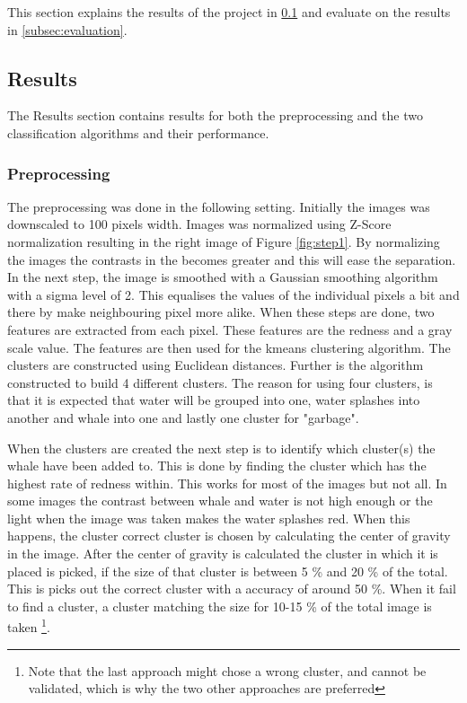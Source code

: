 This section explains the results of the project in \ref{subsec:results} and evaluate on the results in \ref{subsec:evaluation}.

\subsection{Results}
\label{subsec:results}
The Results section contains results for both the preprocessing and the two classification algorithms and their performance.


\subsubsection{Preprocessing}
The preprocessing was done in the following setting.
Initially the images was downscaled to 100 pixels width.
Images was normalized using Z-Score normalization resulting in the right image of Figure \ref{fig:step1}. By normalizing the images the contrasts in the becomes greater and this will ease the separation.
In the next step, the image is smoothed with a Gaussian smoothing algorithm with a sigma level of 2. This equalises the values of the individual pixels a bit and there by make neighbouring pixel more alike.
When these steps are done, two features are extracted from each pixel.
These features are the redness and a gray scale value.
The features are then used for the kmeans clustering algorithm.
The clusters are constructed using Euclidean distances. Further is the algorithm constructed to build 4 different clusters.
The reason for using four clusters, is that it is expected that water will be grouped into one, water splashes into another and whale into one and lastly one cluster for "garbage". 

When the clusters are created the next step  is to identify which cluster(s) the whale have been added to.
This is done by finding the cluster which has the highest rate of redness within. This works for most of the images but not all. In some images the contrast between whale and water is not high enough or the light when the image was taken makes the water splashes red. When this happens, the cluster correct cluster is chosen by calculating the center of gravity in the image. After the center of gravity is calculated the cluster in which it is placed is picked, if the size of that cluster is between 5 \% and 20 \% of the total. This is picks out the correct cluster with a accuracy of around 50 \%.
When it fail to find a cluster, a cluster matching the size for 10-15 \% of the total image is taken \footnote{Note that the last approach might chose a wrong cluster, and cannot be validated, which is why the two other approaches are preferred}. 

